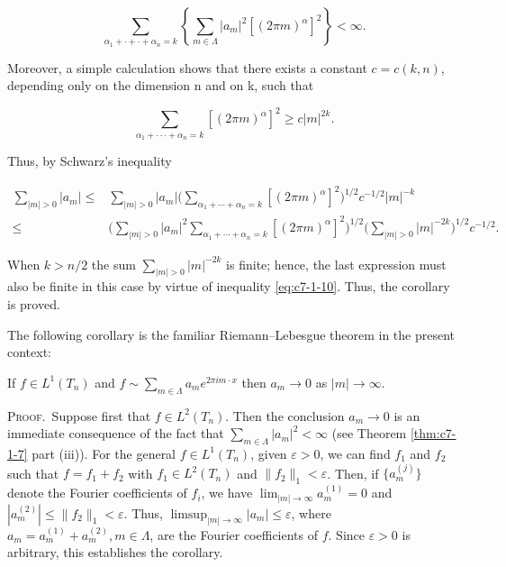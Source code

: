 \begin{equation}\label{eq:c7-1-10}
\sum_{\alpha_{1}+\cdot+\cdot+\alpha_{n}=k}\left\{\sum_{m\in\Lambda}|a_{m}|^{2}[(2\pi m)^{\alpha}]^{2}\right\}<\infty.
\end{equation}

Moreover, a simple calculation shows that there exists a constant $c = c(k, n)$, depending only on the dimension n and on k, such that

\[
\sum_{\alpha_{1}+\cdot\cdot\cdot+\alpha_{n}=k}[(2\pi m)^{\alpha}]^{2}\geq c|m|^{2k}.
\]

Thus, by Schwarz's inequality

\[
\begin{aligned}\sum_{|m|>0}|a_{m}|\leq&\sum_{|m|>0}|a_{m}|\biggl(\sum_{\alpha_{1}+\cdots+\alpha_{n}=k}[(2\pi m)^{\alpha}]^{2}\biggr)^{1/2}c^{-1/2}|m|^{-k}\\\leq&\biggl(\sum_{|m|>0}|a_{m}|^{2}\sum_{\alpha_{1}+\cdots+\alpha_{n}=k}[(2\pi m)^{\alpha}]^{2}\biggr)^{1/2}\biggl(\sum_{|m|>0}|m|^{-2k}\biggr)^{1/2}c^{-1/2}.\end{aligned}
\]

When $k > n/2$ the sum $\sum_{|m| > 0} |m|^{-2k}$ is finite; hence, the last expression must also be finite in this case by virtue of inequality \eqref{eq:c7-1-10}. Thus, the corollary is proved.

The following corollary is the familiar Riemann--Lebesgue theorem in the present context:

\begin{corollary}
\label{cor:c7-1-11}
If $f \in L^1(T_n)$ and $f \sim \sum_{m \in \Lambda} a_m e^{2\pi i m \cdot x}$ then $a_m \to 0$ as $|m| \to \infty$.
\end{corollary}

\textsc{Proof.}\ Suppose first that $f \in L^{2}(T_{n})$. Then the conclusion $a_{m} \to 0$ is an immediate consequence of the fact that $\sum_{m \in \Lambda} |a_{m}|^{2} < \infty$ (see Theorem \ref{thm:c7-1-7} part (iii)). For the general $f \in L^{1}(T_{n})$, given $\varepsilon > 0$, we can find $f_{1}$ and $f_{2}$ such that $f = f_{1} + f_{2}$ with $f_{1} \in L^{2}(T_{n})$ and $\|f_{2}\|_{1} < \varepsilon$. Then, if $\{a_{m}^{(j)}\}$ denote the Fourier coefficients of $f_{i}$, we have $\lim_{|m| \to \infty} a_{m}^{(1)} = 0$ and $|a_{m}^{(2)}| \leq \|f_{2}\|_{1} < \varepsilon$. Thus, $\limsup_{|m| \to \infty} |a_{m}| \leq \varepsilon$, where $a_{m} = a_{m}^{(1)} + a_{m}^{(2)}, m \in \Lambda$, are the Fourier coefficients of $f$. Since $\varepsilon > 0$ is arbitrary, this establishes the corollary.

